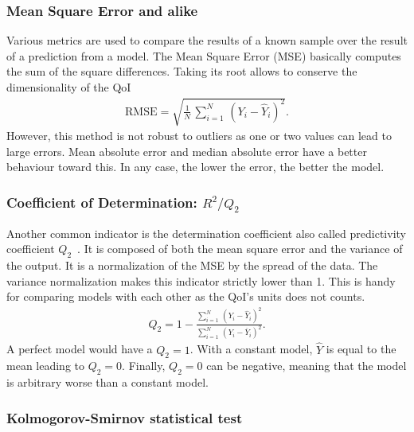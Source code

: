\subsubsection{Mean Square Error and alike}
Various metrics are used to compare the results of a known sample over the result of a prediction from a model. The Mean Square Error (MSE) basically computes the sum of the square differences. Taking its root allows to conserve the dimensionality of the QoI
\begin{align}
\text{RMSE} = \sqrt{\frac{1}{N}\,
\displaystyle\sum_{i = 1}^{N}\,(Y_i - \hat{Y}_{i})^2}.
\end{align}
However, this method is not robust to outliers as one or two values can lead to large errors. Mean absolute error and median absolute error have a better behaviour toward this. In any case, the lower the error, the better the model.

\subsubsection{Coefficient of Determination: $R^2/Q_2$}
Another common indicator is the determination coefficient also called predictivity coefficient $Q_2$~\citep{marrel2009}. It is composed of both the mean square error and the variance of the output. It is a normalization of the MSE by the spread of the data. The variance normalization makes this indicator strictly lower than 1. This is handy for comparing models with each other as the QoI's units does not counts.
\begin{align} 
Q_{2} = 1 - \frac{\displaystyle\sum_{i = 1}^{N}\,\left(Y_i - \widehat{Y}_i\right)^2}{\displaystyle\sum_{i = 1}^{N}\,\left(Y_{i} - \overline{Y}_i\right)^2}.
\end{align}
A perfect model would have a $Q_2=1$. With a constant model, $\hat{Y}$ is equal to the mean leading to $Q_2=0$. Finally, $Q_2=0$ can be negative, meaning that the model is arbitrary worse than a constant model.

\subsubsection{Kolmogorov-Smirnov statistical test}

